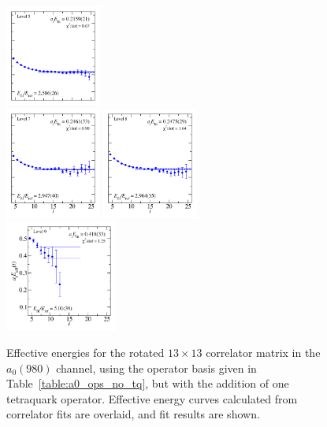 \begin{figure}
  \includegraphics[width=0.28\textwidth]{figures/spectrum_a1gm/with_tq/fits/fit_5.pdf}\\
  \includegraphics[width=0.28\textwidth]{figures/spectrum_a1gm/with_tq/fits/fit_7.pdf}
  \includegraphics[width=0.28\textwidth]{figures/spectrum_a1gm/with_tq/fits/fit_8.pdf}\\[-0.4cm]
  \includegraphics[width=0.329\textwidth]{figures/spectrum_a1gm/with_tq/fits/fit_9.pdf}
  \caption{Effective energies for the rotated $13\times 13$ correlator matrix in the $a_0(980)$ channel, using the operator basis given in Table~\ref{table:a0_ops_no_tq}, but with the addition of one tetraquark operator. Effective energy curves calculated from correlator fits are overlaid, and fit results are shown.}
  \label{fig:a0_with_tq_grid}
\end{figure}

